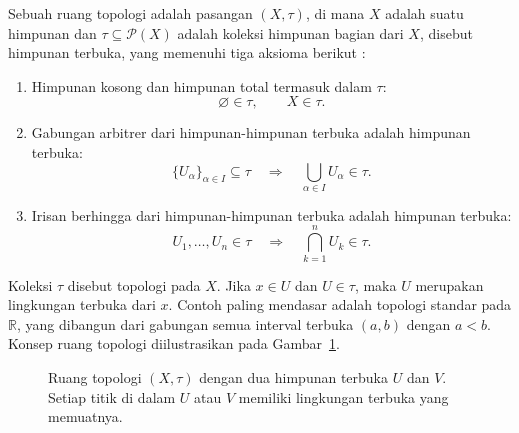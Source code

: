 Sebuah ruang topologi adalah pasangan $(X, \tau)$, di mana $X$ adalah suatu himpunan dan $\tau \subseteq \mathcal{P}(X)$ adalah koleksi himpunan bagian dari $X$, disebut himpunan terbuka, yang memenuhi tiga aksioma berikut \cite{nakahara2003geometry}:
\begin{enumerate}[label=\roman*.]
    \item Himpunan kosong dan himpunan total termasuk dalam $\tau$:
    \begin{equation}
        \varnothing \in \tau, \qquad X \in \tau.
    \end{equation}
    \item Gabungan arbitrer dari himpunan-himpunan terbuka adalah himpunan terbuka:
    \begin{equation}
        \{U_\alpha\}_{\alpha \in I} \subseteq \tau
        \quad \Longrightarrow \quad
        \bigcup_{\alpha \in I} U_\alpha \in \tau.
    \end{equation}
    \item Irisan berhingga dari himpunan-himpunan terbuka adalah himpunan terbuka:
    \begin{equation}
        U_1, \ldots, U_n \in \tau
        \quad \Longrightarrow \quad
        \bigcap_{k=1}^{n} U_k \in \tau.
    \end{equation}
\end{enumerate}
Koleksi $\tau$ disebut topologi pada $X$. Jika $x \in U$ dan $U \in \tau$, maka $U$ merupakan lingkungan terbuka dari $x$. Contoh paling mendasar adalah topologi standar pada $\mathbb{R}$, yang dibangun dari gabungan semua interval terbuka $(a, b)$ dengan $a < b$. Konsep ruang topologi diilustrasikan pada Gambar~\ref{fig:ruang-topologi}.

\begin{figure}[H]
\centering
{}
\caption{Ruang topologi $(X, \tau)$ dengan dua himpunan terbuka $U$ dan $V$. Setiap titik di dalam $U$ atau $V$ memiliki lingkungan terbuka yang memuatnya.}
\label{fig:ruang-topologi}
\end{figure}

